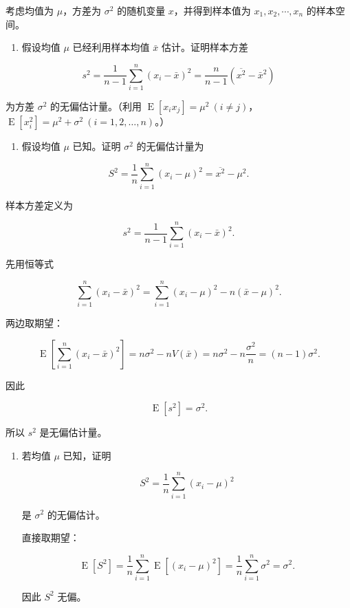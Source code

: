 \begin{question}
考虑均值为 \(\mu\)，方差为 \(\sigma^2\) 的随机变量 \(x\)，并得到样本值为
\(x_1,x_2,\cdots,x_n\) 的样本空间。

\begin{enumerate}
\item
  假设均值 \(\mu\) 已经利用样本均值 \(\bar x\) 估计。证明样本方差
\end{enumerate}

\[
s^2=\frac{1}{n-1}\sum_{i=1}^{n}(x_i-\bar x)^2=\frac{n}{n-1}(\overline{x^2}-\bar x^2)
\]

为方差 \(\sigma^2\) 的无偏估计量。（利用
\(\operatorname{E}[x_ix_j]=\mu^2\ (i\ne j)\)，\(\operatorname{E}[x_i^2]=\mu^2+\sigma^2\ (i=1,2,\ldots,n)\)。）

\begin{enumerate}[start=2]
\item
  假设均值 \(\mu\) 已知。证明 \(\sigma^2\) 的无偏估计量为
\end{enumerate}

\[
S^2=\frac1n\sum_{i=1}^{n}(x_i-\mu)^2=\overline{x^2}-\mu^2.
\]
\begin{solution}
样本方差定义为

\[
s^2=\frac1{n-1}\sum_{i=1}^n (x_i-\bar x)^2.
\]

先用恒等式

\[
\sum_{i=1}^n (x_i-\bar x)^2=\sum_{i=1}^n (x_i-\mu)^2-n(\bar x-\mu)^2.
\]

两边取期望：

\[
\operatorname{E}\left[\sum_{i=1}^n (x_i-\bar x)^2\right]
= n\sigma^2 - nV(\bar x)
= n\sigma^2 - n\frac{\sigma^2}{n}
= (n-1)\sigma^2.
\]

因此

\[
\operatorname{E}[s^2]=\sigma^2.
\]

所以 \(s^2\) 是无偏估计量。

\begin{enumerate}[start=2]
\item 若均值 \(\mu\) 已知，证明

\[
S^2=\frac1n\sum_{i=1}^n (x_i-\mu)^2
\]

是 \(\sigma^2\) 的无偏估计。

直接取期望：

\[
\operatorname{E}[S^2]=\frac1n\sum_{i=1}^n \operatorname{E}[(x_i-\mu)^2]=\frac1n\sum_{i=1}^n \sigma^2=\sigma^2.
\]

因此 \(S^2\) 无偏。
\end{enumerate}
\end{solution}
\end{question}


